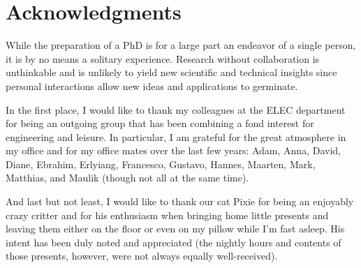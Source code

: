 \chapter{Acknowledgments}

While the preparation of a PhD is for a large part an endeavor of a single person, it is by no means a solitary experience.
Research without collaboration is unthinkable and is unlikely to yield new scientific and technical insights since personal interactions allow new ideas and applications to germinate.

In the first place, I would like to thank my colleagues at the ELEC department for being an outgoing group that has been combining a fond interest for engineering and leisure.
In particular, I am grateful for the great atmosphere in my office and for my office mates over the last few years: Adam, Anna, David, Diane, Ebrahim, Erlyiang, Francesco, Gustavo, Hannes, Maarten, Mark, Matthias, and Maulik (though not all at the same time).









And last but not least, I would like to thank our cat Pixie for being an enjoyably crazy critter and for his enthusiasm when bringing home little presents and leaving them either on the floor or even on my pillow while I'm fast asleep.
His intent has been duly noted and appreciated (the nightly hours and contents of those presents, however, were not always equally well-received).


